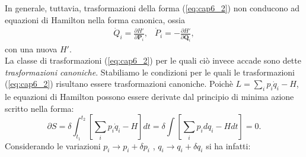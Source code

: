 \documentclass[a4paper,12pt,oneside]{book}
\begin{document}
In generale, tuttavia, trasformazioni della forma (\ref{eq:cap6_2}) non conducono ad equazioni di Hamilton nella forma canonica, ossia
\begin{equation}
\begin{matrix}
\dot{Q}_i = \frac{\partial H'}{\partial \mathbf{P}_i}, & \dot{P}_i = -\frac{\partial H'}{\partial \mathbf{Q}_i}  ,
\end{matrix}
\end{equation}
con una nuova $H'$.\\
La classe di trasformazioni (\ref{eq:cap6_2}) per le quali ci\`o invece accade sono dette \textit{trasformazioni canoniche}. Stabiliamo le condizioni per le quali le trasformazioni (\ref{eq:cap6_2}) risultano essere trasformazioni canoniche.
Poich\`e $ L = \sum _i p_i \dot{q}_i -H $, le equazioni di Hamilton possono essere derivate dal principio di minima azione scritto nella forma:
\begin{equation}
\partial S = \delta \int_{t_1}^{t_2} \left[ \sum_i p_i \dot{q}_i - H \right] dt = \delta \int \left[ \sum_i p_i dq_i - Hdt \right] = 0 .
\label{eq:cap6_3}
\end{equation}
Considerando le variazioni $p_i \rightarrow p_i + \delta p_i$ , $q_i \rightarrow q_i + \delta q_i$ si ha infatti:
\end{document}
